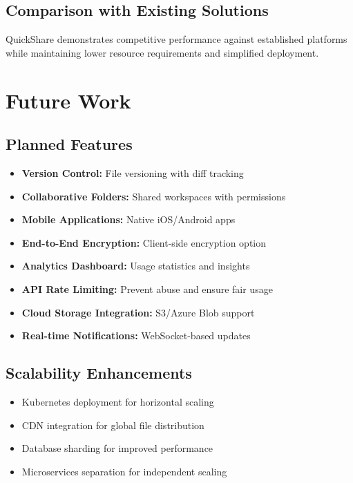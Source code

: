 \documentclass[final]{cvpr}
\begin{document}
\subsection{Comparison with Existing Solutions}
QuickShare demonstrates competitive performance against established platforms while maintaining lower resource requirements and simplified deployment.

\section{Future Work}

\subsection{Planned Features}
\begin{itemize}
    \item \textbf{Version Control:} File versioning with diff tracking
    \item \textbf{Collaborative Folders:} Shared workspaces with permissions
    \item \textbf{Mobile Applications:} Native iOS/Android apps
    \item \textbf{End-to-End Encryption:} Client-side encryption option
    \item \textbf{Analytics Dashboard:} Usage statistics and insights
    \item \textbf{API Rate Limiting:} Prevent abuse and ensure fair usage
    \item \textbf{Cloud Storage Integration:} S3/Azure Blob support
    \item \textbf{Real-time Notifications:} WebSocket-based updates
\end{itemize}

\subsection{Scalability Enhancements}
\begin{itemize}
    \item Kubernetes deployment for horizontal scaling
    \item CDN integration for global file distribution
    \item Database sharding for improved performance
    \item Microservices separation for independent scaling
\end{itemize}
\end{document}
